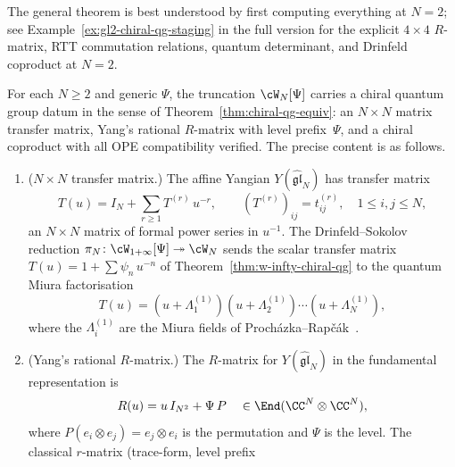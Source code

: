 The general theorem is best understood by first computing
everything at $N = 2$; see
Example~\ref{ex:gl2-chiral-qg-staging} in the full version
for the explicit $4 \times 4$ $R$-matrix, RTT commutation
relations, quantum determinant, and Drinfeld coproduct at
$N = 2$.

\begin{theorem}
\label{thm:glN-chiral-qg}
For each $N \geq 2$ and generic $\Psi$, the truncation
$\cW_N[\Psi]$ carries a chiral quantum group datum in
the sense of
Theorem~\textup{\ref{thm:chiral-qg-equiv}}: an $N \times N$
matrix transfer matrix, Yang's rational $R$-matrix with
level prefix~$\Psi$, and a chiral coproduct with all
OPE compatibility verified.
The precise content is as follows.
\begin{enumerate}[label=\textup{(\Roman*)}]
\item \textup{($N \times N$ transfer matrix.)}
  The affine Yangian $Y(\widehat{\mathfrak{gl}}_N)$ has
  transfer matrix
  \begin{equation}\label{eq:glN-transfer}
    T(u)
    = I_N + \sum_{r \geq 1} T^{(r)}\, u^{-r},
    \qquad
    (T^{(r)})_{ij} = t_{ij}^{(r)},
    \quad 1 \leq i,j \leq N,
  \end{equation}
  an $N \times N$ matrix of formal power series in
  $u^{-1}$. The Drinfeld--Sokolov reduction
  $\pi_N \colon \cW_{1+\infty}[\Psi]
  \twoheadrightarrow \cW_N$ sends the scalar transfer
  matrix $T(u) = 1 + \sum \psi_n\, u^{-n}$ of
  Theorem~\textup{\ref{thm:w-infty-chiral-qg}}
  to the quantum Miura factorisation
  \begin{equation}\label{eq:glN-miura}
    T(u)
    = (u + \Lambda_1^{(1)})
    (u + \Lambda_2^{(1)})
    \cdots
    (u + \Lambda_N^{(1)}),
  \end{equation}
  where the $\Lambda_i^{(1)}$ are the Miura fields of
  Proch\'azka--Rap\v{c}\'ak~\textup{\cite{PR19}}.
\item \textup{(Yang's rational $R$-matrix.)}
  The $R$-matrix for $Y(\widehat{\mathfrak{gl}}_N)$
  in the fundamental representation is
  \begin{equation}\label{eq:glN-yang-r}
    R(u)
    = u\, I_{N^2} + \Psi\, P
    \quad \in \End(\CC^N \otimes \CC^N),
  \end{equation}
  where $P(e_i \otimes e_j) = e_j \otimes e_i$ is the
  permutation and $\Psi$ is the level.
  The classical $r$-matrix
  \textup{(}trace-form, level prefix

\end{enumerate}
\end{theorem}
